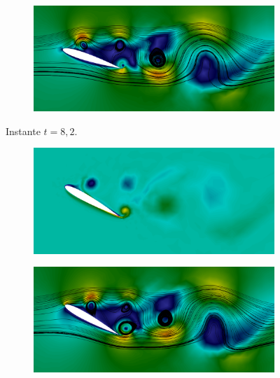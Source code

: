 \begin{figure}[h!]
\begin{subfigure}{.45\linewidth}
    \end{subfigure}
    \begin{subfigure}{.45\linewidth}
        \centering
        \includegraphics[width=\linewidth]{Figuras/rotating-airfoil/str2.png}
    \end{subfigure}
    \caption*{Instante $t=8,2$.}
    \begin{subfigure}{.45\linewidth}
        \centering
        \includegraphics[width=\linewidth]{Figuras/rotating-airfoil/vort3.png}
    \end{subfigure}
    \begin{subfigure}{.45\linewidth}
        \centering
        \includegraphics[width=\linewidth]{Figuras/rotating-airfoil/str3.png}
    \end{subfigure}
    \caption*{Instante $t=8,4$.}
    \begin{subfigure}{.45\linewidth}

\end{subfigure}
\end{figure}
